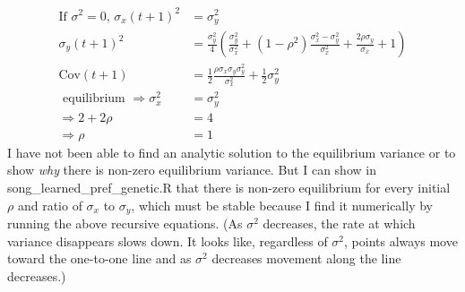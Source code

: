 \documentclass{article}
\newcommand{\Cov}{\text{Cov}}
\begin{document}
\begin{align*}
\text{If $\sigma^2=0$, } \sigma_x(t+1)^2&=\sigma_y^2
\\ \sigma_y(t+1)^2&=\frac{\sigma_y^2}{4}\left(\frac{\sigma_y^2}{\sigma_x^2}+(1-\rho^2)\frac{\sigma_x^2-\sigma_y^2}{\sigma_x^2}+\frac{2\rho\sigma_y}{\sigma_x}+1\right)
\\\Cov(t+1)&=\frac{1}{2}\frac{\rho\sigma_x\sigma_y\sigma_y^2}{\sigma_x^2}+\frac{1}{2}\sigma_y^2
\\ \text{ equilibrium } \Rightarrow \sigma_x^2&=\sigma_y^2
\\ \Rightarrow 2+2\rho&=4
\\ \Rightarrow \rho&=1
\end{align*}
I have not been able to find an analytic solution to the equilibrium variance or to show \emph{why} there is non-zero equilibrium variance. But I can show in song\_learned\_pref\_genetic.R that there is non-zero equilibrium for every initial $\rho$ and ratio of $\sigma_{x}$ to $\sigma_y$, which must be stable because I find it numerically by running the above recursive equations. (As $\sigma^2$ decreases, the rate at which variance disappears slows down. It looks like, regardless of $\sigma^2$, points always move toward the one-to-one line and as $\sigma^2$ decreases movement along the line decreases.)
\end{document}
